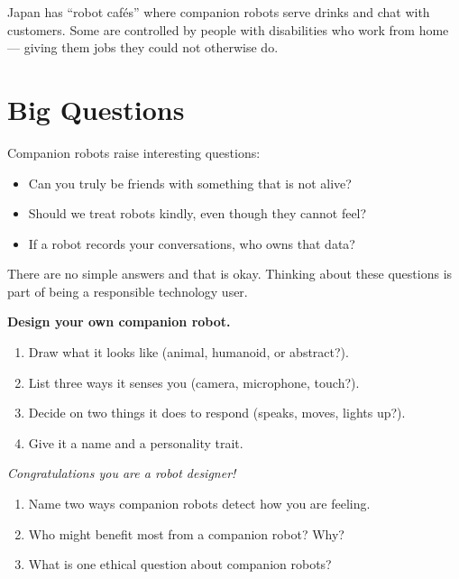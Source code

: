 \sectionrule

\begin{funfact}
  Japan has ``robot caf\'{e}s'' where companion robots serve drinks
  and chat with customers. Some are controlled by people with
  disabilities who work from home --- giving them jobs they
  could not otherwise do.
\end{funfact}

\sectionrule

\section*{Big Questions}

Companion robots raise interesting questions:
\begin{itemize}
  \item Can you truly be friends with something that is not alive?
  \item Should we treat robots kindly, even though they cannot feel?
  \item If a robot records your conversations, who owns that data?
\end{itemize}

There are no simple answers \textemdash{} and that is okay. Thinking about
these questions is part of being a responsible technology user.

\sectionrule

\begin{experiment}
  \textbf{Design your own companion robot.}
  \begin{enumerate}
    \item Draw what it looks like (animal, humanoid, or abstract?).
    \item List three ways it senses you (camera, microphone, touch?).
    \item Decide on two things it does to respond (speaks, moves, lights up?).
    \item Give it a name and a personality trait.
  \end{enumerate}
  \textit{Congratulations \textemdash{} you are a robot designer!}
\end{experiment}

\sectionrule


\begin{quickcheck}
  \begin{enumerate}
    \item Name two ways companion robots detect how you are feeling.
    \item Who might benefit most from a companion robot? Why?
    \item What is one ethical question about companion robots?
  \end{enumerate}
\end{quickcheck}

